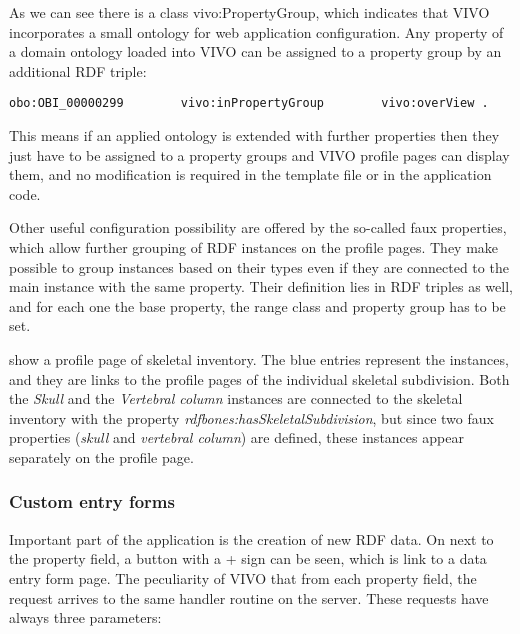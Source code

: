 As we can see there is a class vivo:PropertyGroup, which indicates that VIVO incorporates a small ontology for web application configuration. Any property of a domain ontology loaded into VIVO can be assigned to a property group by an additional RDF triple:

\begin{lstlisting}[captionpos=b, caption=Assigning property to propery group, label=jsListing, belowskip=1em, aboveskip=2em,
basicstyle=\footnotesize,frame=single]
obo:OBI_00000299		vivo:inPropertyGroup 		vivo:overView .
\end{lstlisting}


This means if an applied ontology is extended with further properties then they just have to be assigned to a property groups and VIVO profile pages can display them, and no modification is required in the template file or in the application code.

Other useful configuration possibility are offered by the so-called faux properties, which allow further grouping of RDF instances on the profile pages. They make possible to group instances based on their types even if they are connected to the main instance with the same property. Their definition lies in RDF triples as well, and for each one the base property, the range class and property group has to be set.



 show a profile page of skeletal inventory. The blue entries represent the instances, and they are links to the profile pages of the individual skeletal subdivision. Both the \textit{Skull} and the \textit{Vertebral column} instances are connected to the skeletal inventory with the property \textit{rdfbones:hasSkeletalSubdivision}, but since two faux properties (\textit{skull} and \textit{vertebral column}) are defined, these instances appear separately on the profile page.

\subsubsection{Custom entry forms} \label{vivoCef}

Important part of the application is the creation of new RDF data. On  next to the property field, a button with a + sign can be seen, which is link to a data entry form page. The peculiarity of VIVO that from each property field, the request arrives to the same handler routine on the server. These requests have always three parameters:

